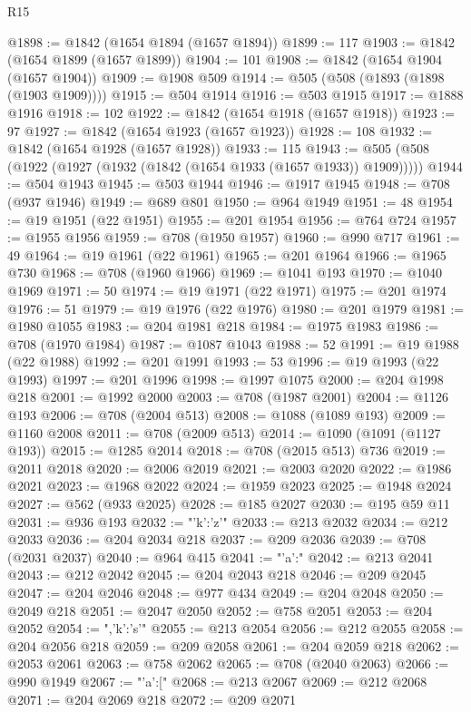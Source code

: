 \begin{lexlean}{R15}
\begin{coremodule}
{{{{{{@1898 := @1842 (@1654 @1894 (@1657 @1894))
@1899 := 117
@1903 := @1842 (@1654 @1899 (@1657 @1899))
@1904 := 101
@1908 := @1842 (@1654 @1904 (@1657 @1904))
@1909 := @1908 @509
@1914 := @505 (@508 (@1893 (@1898 (@1903 @1909))))
@1915 := @504 @1914
@1916 := @503 @1915
@1917 := @1888 @1916
@1918 := 102
@1922 := @1842 (@1654 @1918 (@1657 @1918))
@1923 := 97
@1927 := @1842 (@1654 @1923 (@1657 @1923))
@1928 := 108
@1932 := @1842 (@1654 @1928 (@1657 @1928))
@1933 := 115
@1943 := @505 (@508 (@1922 (@1927 (@1932 (@1842 (@1654 @1933 (@1657 @1933)) @1909)))))
@1944 := @504 @1943
@1945 := @503 @1944
@1946 := @1917 @1945
@1948 := @708 (@937 @1946)
@1949 := @689 @801
@1950 := @964 @1949
@1951 := 48
@1954 := @19 @1951 (@22 @1951)
@1955 := @201 @1954
@1956 := @764 @724
@1957 := @1955 @1956
@1959 := @708 (@1950 @1957)
@1960 := @990 @717
@1961 := 49
@1964 := @19 @1961 (@22 @1961)
@1965 := @201 @1964
@1966 := @1965 @730
@1968 := @708 (@1960 @1966)
@1969 := @1041 @193
@1970 := @1040 @1969
@1971 := 50
@1974 := @19 @1971 (@22 @1971)
@1975 := @201 @1974
@1976 := 51
@1979 := @19 @1976 (@22 @1976)
@1980 := @201 @1979
@1981 := @1980 @1055
@1983 := @204 @1981 @218
@1984 := @1975 @1983
@1986 := @708 (@1970 @1984)
@1987 := @1087 @1043
@1988 := 52
@1991 := @19 @1988 (@22 @1988)
@1992 := @201 @1991
@1993 := 53
@1996 := @19 @1993 (@22 @1993)
@1997 := @201 @1996
@1998 := @1997 @1075
@2000 := @204 @1998 @218
@2001 := @1992 @2000
@2003 := @708 (@1987 @2001)
@2004 := @1126 @193
@2006 := @708 (@2004 @513)
@2008 := @1088 (@1089 @193)
@2009 := @1160 @2008
@2011 := @708 (@2009 @513)
@2014 := @1090 (@1091 (@1127 @193))
@2015 := @1285 @2014
@2018 := @708 (@2015 @513) @736
@2019 := @2011 @2018
@2020 := @2006 @2019
@2021 := @2003 @2020
@2022 := @1986 @2021
@2023 := @1968 @2022
@2024 := @1959 @2023
@2025 := @1948 @2024
@2027 := @562 (@933 @2025)
@2028 := @185 @2027
@2030 := @195 @59 @11
@2031 := @936 @193
@2032 := "{'k':'z'}"
@2033 := @213 @2032
@2034 := @212 @2033
@2036 := @204 @2034 @218
@2037 := @209 @2036
@2039 := @708 (@2031 @2037)
@2040 := @964 @415
@2041 := "{'a':"
@2042 := @213 @2041
@2043 := @212 @2042
@2045 := @204 @2043 @218
@2046 := @209 @2045
@2047 := @204 @2046
@2048 := @977 @434
@2049 := @204 @2048
@2050 := @2049 @218
@2051 := @2047 @2050
@2052 := @758 @2051
@2053 := @204 @2052
@2054 := ",'k':'s'}"
@2055 := @213 @2054
@2056 := @212 @2055
@2058 := @204 @2056 @218
@2059 := @209 @2058
@2061 := @204 @2059 @218
@2062 := @2053 @2061
@2063 := @758 @2062
@2065 := @708 (@2040 @2063)
@2066 := @990 @1949
@2067 := "{'a':["
@2068 := @213 @2067
@2069 := @212 @2068
@2071 := @204 @2069 @218
@2072 := @209 @2071
}}}}}}}
\end{coremodule}
\end{lexlean}
